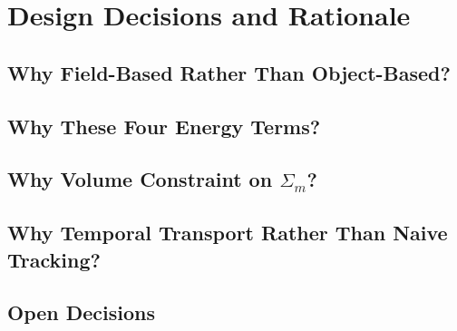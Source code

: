 \chapter{Design Decisions and Rationale}
\label{app:design-decisions}


\section{Why Field-Based Rather Than Object-Based?}


\section{Why These Four Energy Terms?}


\section{Why Volume Constraint on $\Sigma_m$?}


\section{Why Temporal Transport Rather Than Naive Tracking?}


\section{Open Decisions}


\cleardoublepage
